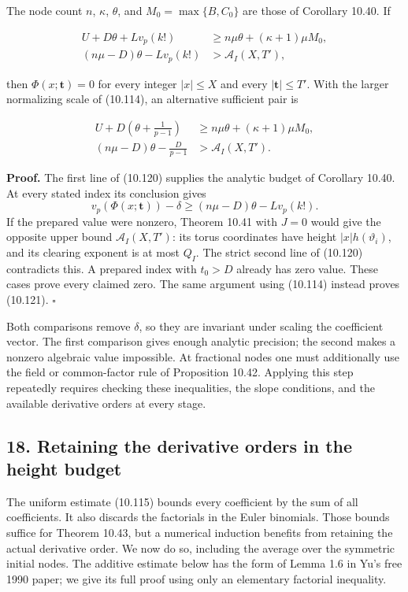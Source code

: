 \documentclass[
  11pt,
  a4paper,
]{article}
\begin{document}
The node count \(n\), \(\kappa\), \(\theta\), and \(M_0=\max\{B,C_0\}\)
are those of Corollary 10.40. If

\[
\begin{aligned}
U+D\theta+L v_p(k!)&\ge n\mu\theta+(\kappa+1)\mu M_0,\\
(n\mu-D)\theta-L v_p(k!)&>\mathcal A_I(X,T'),
\end{aligned}
\tag{10.120}
\]

then \(\Phi(x;\boldsymbol t)=0\) for every integer \(|x|\le X\) and
every \(|\boldsymbol t|\le T'\). With the larger normalizing scale of
(10.114), an alternative sufficient pair is

\[
\begin{aligned}
U+D\left(\theta+\frac1{p-1}\right)&\ge n\mu\theta+(\kappa+1)\mu M_0,\\
(n\mu-D)\theta-\frac D{p-1}&>\mathcal A_I(X,T').
\end{aligned}
\tag{10.121}
\]

\textbf{Proof.} The first line of (10.120) supplies the analytic budget
of Corollary 10.40. At every stated index its conclusion gives \[
v_p(\Phi(x;\boldsymbol t))-\delta
\ge(n\mu-D)\theta-L v_p(k!).
\] If the prepared value were nonzero, Theorem 10.41 with \(J=0\) would
give the opposite upper bound \(\mathcal A_I(X,T')\): its torus
coordinates have height \(|x|h(\vartheta_i)\), and its clearing exponent
is at most \(Q_I\). The strict second line of (10.120) contradicts this.
A prepared index with \(t_0>D\) already has zero value. These cases
prove every claimed zero. The same argument using (10.114) instead
proves (10.121). \(\square\)

Both comparisons remove \(\delta\), so they are invariant under scaling
the coefficient vector. The first comparison gives enough analytic
precision; the second makes a nonzero algebraic value impossible. At
fractional nodes one must additionally use the field or common-factor
rule of Proposition 10.42. Applying this step repeatedly requires
checking these inequalities, the slope conditions, and the available
derivative orders at every stage.

\subsection{18. Retaining the derivative orders in the height
budget}\label{retaining-the-derivative-orders-in-the-height-budget}

The uniform estimate (10.115) bounds every coefficient by the sum of all
coefficients. It also discards the factorials in the Euler binomials.
Those bounds suffice for Theorem 10.43, but a numerical induction
benefits from retaining the actual derivative order. We now do so,
including the average over the symmetric initial nodes. The additive
estimate below has the form of Lemma 1.6 in Yu's free 1990 paper; we
give its full proof using only an elementary factorial inequality.
\end{document}
